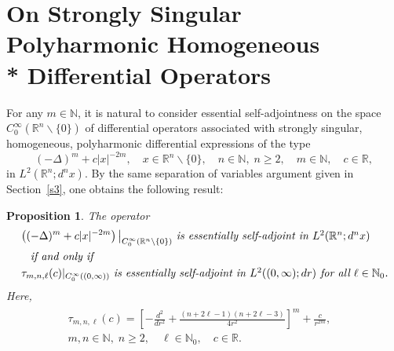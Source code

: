 \documentclass[reqno,11pt,centertags]{amsart}
\newcommand{\bbN}{{\mathbb{N}}}
\newcommand{\bbR}{{\mathbb{R}}}
\newcommand{\<}{\langle}
\renewcommand{\>}{\rangle}
\newcommand{\no}{\nonumber}
\newcommand{\lb}{\label}
\numberwithin{equation}{section}
\newtheorem{proposition}[theorem]{Proposition}
\theoremstyle{definition}
\begin{document}
\section{On Strongly Singular Polyharmonic Homogeneous\\* Differential Operators} \lb{s4}

For  any $m\in \bbN$, it is natural to consider essential self-adjointness on the space $C_0^{\infty}(\bbR^n \backslash \{0\})$
of differential operators associated with strongly singular, homogeneous, polyharmonic differential expressions  of the type 
\begin{equation}
(-\Delta)^m +c|x|^{-2m}, \quad x\in \bbR^n \backslash \{0\},\quad n\in\bbN, \; n\geq 2,\quad m \in \bbN, \quad  c\in \bbR, 
\end{equation}
in $L^2(\bbR^n;d^nx)$. 
By the same separation of variables argument given in Section~\ref{s3}, one obtains the following result: 
\begin{proposition} \lb{p4.1} The operator 
\begin{align}
& \left((-\Delta)^m +c|x|^{-2m}\right)\big|_{C_0^{\infty}(\bbR^n \backslash \{0\})}\ \mbox{\it is essentially self-adjoint  in $L^2(\bbR^n; d^n x)$}     \no \\
& \quad \text{\it if and only if}     \\
& \, \tau_{m,n,\ell}(c)|_{C_0^{\infty}((0,\infty))} \   \mbox{\it is essentially self-adjoint in $L^2((0,\infty); dr)$ for all $\ell\in \bbN_0$.}    \no
\end{align}
Here, 
\begin{align}\lb{E:tau_mnl} 
\begin{split}
\tau_{m,n,\ell}(c)= \left[-\frac{d^2}{dr^2} + \frac{(n + 2\ell - 1)(n+2\ell-3)}{4r^2}\right]^m+\frac{c}{r^{2m}},&   \\
 m, n \in \bbN, \; n \geq2, \quad \ell \in \bbN_0, \quad c \in \bbR.& 
 \end{split} 
\end{align}
\end{proposition}
\end{document}
